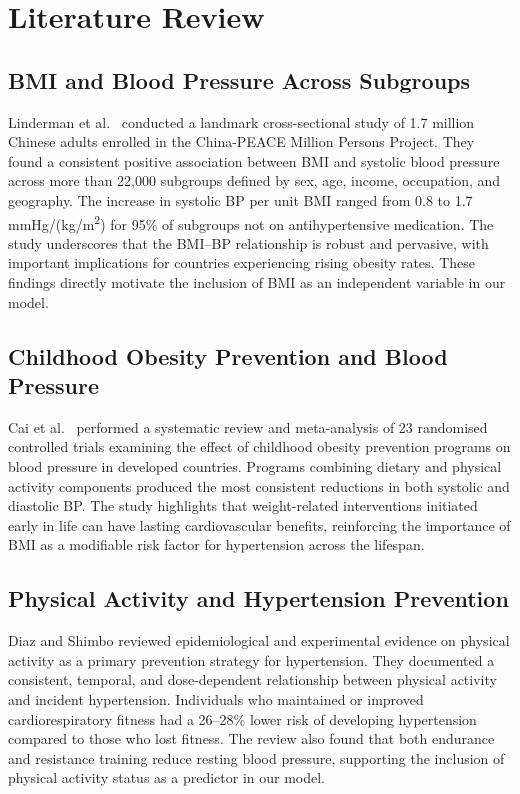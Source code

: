 ﻿\documentclass[conference]{IEEEtran}
\begin{document}
\section{Literature Review}
\label{sec:lit}

\subsection{BMI and Blood Pressure Across Subgroups}

Linderman et al.\ \cite{linderman2018} conducted a landmark cross-sectional study
of 1.7 million Chinese adults enrolled in the China-PEACE Million Persons Project.
They found a consistent positive association between BMI and systolic blood
pressure across more than 22{,}000 subgroups defined by sex, age, income,
occupation, and geography. The increase in systolic BP per unit BMI ranged from
0.8 to 1.7\,mmHg/(kg/m\textsuperscript{2}) for 95\% of subgroups not on
antihypertensive medication. The study underscores that the BMI--BP relationship
is robust and pervasive, with important implications for countries experiencing
rising obesity rates. These findings directly motivate the inclusion of BMI as an
independent variable in our model.

\subsection{Childhood Obesity Prevention and Blood Pressure}

Cai et al.\ \cite{cai2014} performed a systematic review and meta-analysis of 23
randomised controlled trials examining the effect of childhood obesity prevention
programs on blood pressure in developed countries. Programs combining dietary and
physical activity components produced the most consistent reductions in both
systolic and diastolic BP. The study highlights that weight-related interventions
initiated early in life can have lasting cardiovascular benefits, reinforcing the
importance of BMI as a modifiable risk factor for hypertension across the
lifespan.

\subsection{Physical Activity and Hypertension Prevention}

Diaz and Shimbo \cite{nihms2014} reviewed epidemiological and experimental
evidence on physical activity as a primary prevention strategy for hypertension.
They documented a consistent, temporal, and dose-dependent relationship between
physical activity and incident hypertension. Individuals who maintained or
improved cardiorespiratory fitness had a 26--28\% lower risk of developing
hypertension compared to those who lost fitness. The review also found that both
endurance and resistance training reduce resting blood pressure, supporting the
inclusion of physical activity status as a predictor in our model.
\end{document}
